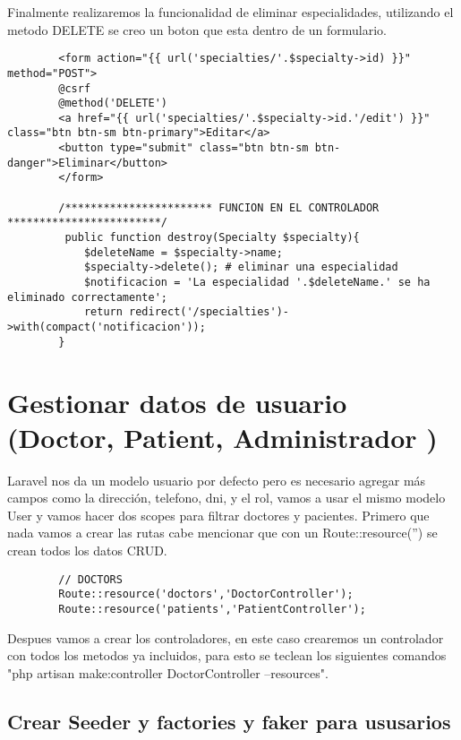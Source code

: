 \documentclass[a4paper]{article}
\begin{document}
	Finalmente realizaremos la funcionalidad de eliminar especialidades, utilizando el metodo DELETE se creo un boton que esta dentro de un formulario.
	
	\begin{lstlisting}
		<form action="{{ url('specialties/'.$specialty->id) }}" method="POST">
		@csrf
		@method('DELETE')
		<a href="{{ url('specialties/'.$specialty->id.'/edit') }}" class="btn btn-sm btn-primary">Editar</a>
		<button type="submit" class="btn btn-sm btn-danger">Eliminar</button>
		</form>
		
		/*********************** FUNCION EN EL CONTROLADOR ************************/
		 public function destroy(Specialty $specialty){
			$deleteName = $specialty->name;
			$specialty->delete(); # eliminar una especialidad
			$notificacion = 'La especialidad '.$deleteName.' se ha eliminado correctamente';
			return redirect('/specialties')->with(compact('notificacion'));
		}
	\end{lstlisting} 


	\section{Gestionar datos de usuario (Doctor, Patient, Administrador )}
	
	Laravel nos da un modelo usuario por defecto pero es necesario agregar más campos como la dirección, telefono, dni, y el rol, vamos a usar el mismo modelo User y vamos hacer dos scopes para filtrar doctores y pacientes. Primero que nada vamos a crear las rutas cabe mencionar que con un Route::resource('') se crean todos los datos CRUD.
	
	\begin{lstlisting}
		// DOCTORS
		Route::resource('doctors','DoctorController');
		Route::resource('patients','PatientController');
	\end{lstlisting} 

	Despues vamos a crear los controladores, en este caso crearemos un controlador con todos los metodos ya incluidos, para esto se teclean los siguientes comandos "php artisan make:controller DoctorController --resources".
	
	\subsection{Crear Seeder y factories y faker para ususarios}
	
\end{document}
